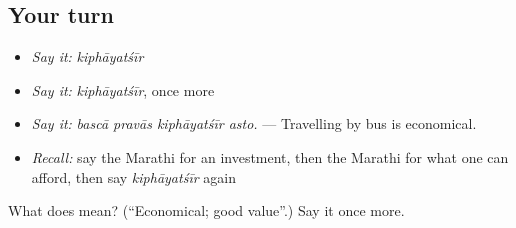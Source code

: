 \subsection*{Your turn}
\begin{itemize}
\raggedright
  \item \emph{Say it:} \emph{kiphāyatśīr}
  \item \emph{Say it:} \emph{kiphāyatśīr}, once more
  \item \emph{Say it:} \emph{bascā pravās kiphāyatśīr asto.} — Travelling by bus is economical.
  \item \emph{Recall:} say the Marathi for an investment, then the Marathi for what one can afford, then say \emph{kiphāyatśīr} again
\end{itemize}

\begin{tcolorbox}[breakable,colback=teal!4,colframe=teal!35!black,title={Before you move on}]
What does  mean? (\textquotedblleft{}Economical; good value\textquotedblright{}.) Say it once more.
\end{tcolorbox}
